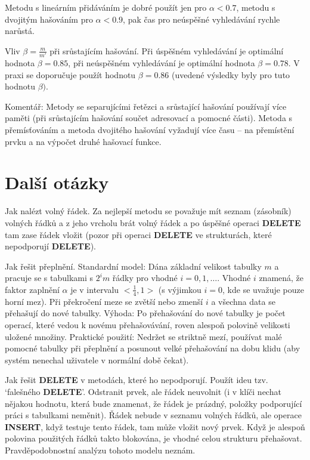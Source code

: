 \documentclass[a4paper,12pt]{article}
\begin{document}
Metodu s lineárním přidáváním je dobré použít jen pro 
$\alpha <0.7$, metodu s dvojitým hašováním pro $\alpha 
<0.9$, pak 
čas pro neúspěšné vyhledávání rychle narůstá.

Vliv $\beta =\frac m{m'}$ při srůstajícím hašování.\newline 
Při 
úspěšném vy\-hledávání je optimální hodnota $
\beta =0.85$, při 
neúspěšném vy\-hledávání je optimální hodnota $
\beta =0.78$. 
V praxi se doporučuje použít hodnotu $\beta =0.86$ (uvedené 
výsledky byly pro tuto hodnotu $\beta ).$

Komentář: Metody se separujícími řetězci a 
srůstající hašování používají více paměti (při 
srůstajícím hašování součet adresovací a 
pomocné části). Metoda s přemís\v továním a metoda 
dvojitého hašování vyžadují více času -- na přemístění 
prvku a na výpočet druhé hašovací funkce.

\section{Další otázky}

Jak nalézt volný řádek.\newline 
Za nejlepší metodu se považuje mít seznam (zásobník) 
volných řádků a z jeho vrcholu brát volný řádek 
a po úspěšné operaci {\bf DELETE} tam zase řádek vložit 
(pozor při operaci {\bf DELETE} ve strukturách, které 
nepodporují {\bf DELETE}).

Jak řešit přeplnění.\newline 
Standardní model: Dána základní velikost tabulky $m$ a 
pracuje se s tabulkami s $2^im$ řádky pro vhodné 
$i=0,1,\dots$. Vhodné $i$ znamená, že faktor zaplnění $
\alpha$ je v 
intervalu $<\frac 14,1>$ (s výjimkou $i=0$, kde se uvažuje 
pouze horní mez). Při překro\-če\-ní meze se zvětší nebo 
zmenší $i$ a všechna data se přehašují do nové 
tabulky.\newline 
Výhoda: Po přehašování do nové tabulky je počet operací, 
které vedou k novému přehašová\-vá\-ní, roven alespoň polovině 
velikosti uložené množiny.\newline 
Praktické použití: Nedržet se striktně mezí, používat 
malé pomocné ta\-bul\-ky při přeplnění a posunout velké 
přehašování na dobu klidu (aby systém nenechal uživatele v 
normální době čekat).

Jak řešit {\bf DELETE} v metodách, které ho 
nepodporují.\newline 
Použít ideu tzv. `falešného {\bf DELETE}'. 
Odstranit prvek, ale řádek neuvolnit (i v klíči nechat 
nějakou hodnotu, která bude znamenat, že řádek je 
prázdný, položky podporující práci s tabulkami neměnit). 
Řádek nebude v seznamu volných řádků, ale 
operace {\bf INSERT}, když testuje tento řádek, tam 
může vložit nový prvek. Když je alespoň 
polovina použitých řádků takto blokována, je 
vhodné celou strukturu přehašovat. Prav\-děpodobnostní 
analýzu tohoto modelu neznám.
\end{document}
